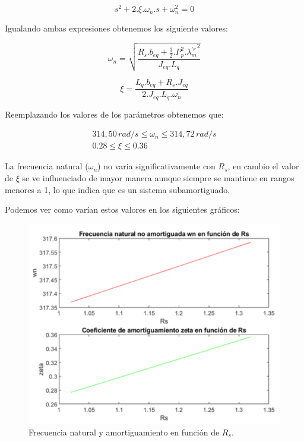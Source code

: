 \documentclass{article}
\begin{document}
\begin{equation}
    s^2 + 2.\xi.\omega_n.s + \omega_n^2 = 0
\end{equation}

Igualando ambas expresiones obtenemos los siguiente valores:

\begin{equation}
    \omega_n = \sqrt{\frac{R_s.b_{eq} + \frac{3}{2}.P_p^2.{\lambda_m^{\prime r}}^2}{J_{eq}.L_q}}
\end{equation}

\begin{equation}
    \xi = \frac{L_q.b_{eq} + R_s.J_{eq}}{2.J_{eq}.L_q.\omega_n}
\end{equation}


Reemplazando los valores de los parámetros obtenemos que:

\begin{equation*}\begin{aligned}
    314,50\,rad/s \leq  \omega_n \leq 314,72\,rad/s \\
    0.28 \leq \xi \leq 0.36 \quad\quad\quad\quad
\end{aligned}\end{equation*}

La frecuencia natural ($\omega_n$) no varia significativamente con $R_s$, en cambio el valor de $\xi$
se ve influenciado de mayor manera aunque siempre se mantiene en rangos menores a 1, lo que 
indica que es un sistema subamortiguado.

Podemos ver como varían estos valores en los siguientes gráficos:

\begin{figure}[H]
    \centering
    \includegraphics{frecuancia_amortiguamiento_rs.png}
    \caption{Frecuencia natural y amortiguamiento en función de $R_s$.}
\end{figure}
\end{document}
